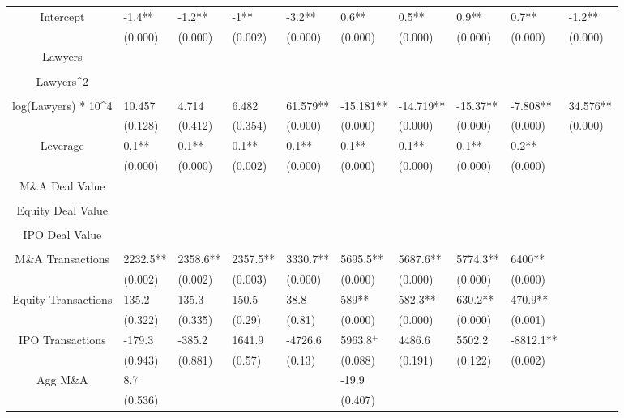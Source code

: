 \documentclass{article}
\begin{document}
\begin{table}[H]
\begin{tabular}{|clllllllll|}
Intercept & -1.4** & -1.2** & -1** & -3.2** & 0.6** & 0.5** & 0.9** & 0.7** & -1.2** \\ 
   & (0.000) & (0.000) & (0.002) & (0.000) & (0.000) & (0.000) & (0.000) & (0.000) & (0.000) \\ 
  Lawyers &  &  &  &  &  &  &  &  &  \\ 
   &  &  &  &  &  &  &  &  &  \\ 
  Lawyers^2 &  &  &  &  &  &  &  &  &  \\ 
   &  &  &  &  &  &  &  &  &  \\ 
  log(Lawyers) * 10^4 & 10.457 & 4.714 & 6.482 & 61.579** & -15.181** & -14.719** & -15.37** & -7.808** & 34.576** \\ 
   & (0.128) & (0.412) & (0.354) & (0.000) & (0.000) & (0.000) & (0.000) & (0.000) & (0.000) \\ 
  Leverage & 0.1** & 0.1** & 0.1** & 0.1** & 0.1** & 0.1** & 0.1** & 0.2** &  \\ 
   & (0.000) & (0.000) & (0.002) & (0.000) & (0.000) & (0.000) & (0.000) & (0.000) &  \\ 
  M\&A Deal Value &  &  &  &  &  &  &  &  &  \\ 
   &  &  &  &  &  &  &  &  &  \\ 
  Equity Deal Value &  &  &  &  &  &  &  &  &  \\ 
   &  &  &  &  &  &  &  &  &  \\ 
  IPO Deal Value &  &  &  &  &  &  &  &  &  \\ 
   &  &  &  &  &  &  &  &  &  \\ 
  M\&A Transactions & 2232.5** & 2358.6** & 2357.5** & 3330.7** & 5695.5** & 5687.6** & 5774.3** & 6400** &  \\ 
   & (0.002) & (0.002) & (0.003) & (0.000) & (0.000) & (0.000) & (0.000) & (0.000) &  \\ 
  Equity Transactions & 135.2 & 135.3 & 150.5 & 38.8 & 589** & 582.3** & 630.2** & 470.9** &  \\ 
   & (0.322) & (0.335) & (0.29) & (0.81) & (0.000) & (0.000) & (0.000) & (0.001) &  \\ 
  IPO Transactions & -179.3 & -385.2 & 1641.9 & -4726.6 & 5963.8$^{+}$ & 4486.6 & 5502.2 & -8812.1** &  \\ 
   & (0.943) & (0.881) & (0.57) & (0.13) & (0.088) & (0.191) & (0.122) & (0.002) &  \\ 
  Agg M\&A & 8.7 &  &  &  & -19.9 &  &  &  &  \\ 
   & (0.536) &  &  &  & (0.407) &  &  &  &  \\ 

\end{tabular}
\end{table}
\end{document}

